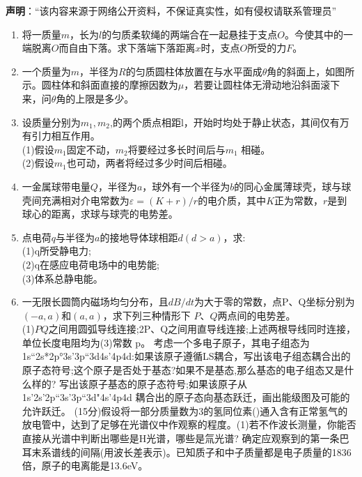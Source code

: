 

\textbf{声明}：“该内容来源于网络公开资料，不保证真实性，如有侵权请联系管理员”

\begin{enumerate}
\item 将一质量$m$，长为$l$的匀质柔软绳的两端合在一起悬挂于支点$O$。今使其中的一端脱离$O$而自由下落。求下落端下落距离$x$时，支点$O$所受的力$F$。
\item 一个质量为$m$，半径为$R$的匀质圆柱体放置在与水平面成$\theta$角的斜面上，如图所示。圆柱体和斜面直接的摩擦因数为$\mu$，若要让圆柱体无滑动地沿斜面滚下来，问$\theta$角的上限是多少。
\item 设质量分别为$m_1,m_2$,的两个质点相距l，开始时均处于静止状态，其间仅有万有引力相互作用。\\
(1)假设$m_1$固定不动，$m_2$将要经过多长时间后与$m_1$ 相碰。\\
(2)假设$m_1$也可动，两者将经过多少时间后相碰。
\item 一金属球带电量$Q$，半径为$a$，球外有一个半径为$b$的同心金属薄球壳，球与球壳间充满相对介电常数为$\varepsilon=(K+r)/r$的电介质，其中$K$正为常数，$r$是到球心的距离，求球与球壳的电势差。
\item 点电荷$q$与半径为$a$的接地导体球相距$d(d>a)$，求:\\
(1)q所受静电力;\\
(2)q在感应电荷电场中的电势能;\\
(3)体系总静电能。
\item 一无限长圆筒内磁场均匀分布，且$dB/dt$为大于零的常数，点P、Q坐标分别为$(-a,a)$和$(a,a)$，求下列三种情形下 $P$、$Q$两点间的电势差。\\
(1)$PQ$之间用圆弧导线连接;2P、Q之间用直导线连接;上述两根导线同时连接，单位长度电阻均为(3)常数 p。
考虑一个多电子原子，其电子组态为 1s“2s*2p°3s’3p“3d4s'4p4d:如果该原子遵循LS耦合，写出该电子组态耦合出的原子态符号;这个原子是否处于基态?如果不是基态,那么基态的电子组态又是什么样的?
写出该原子基态的原子态符号;如果该原子从 1s’2s’2p“3s’3p“3d"4s'4p4d 耦合出的原子态向基态跃迁，画出能级图及可能的允许跃迁。
(15分)假设将一部分质量数为3的氢同位素()通入含有正常氢气的放电管中，达到了足够在光谱仪中作观察的程度。(1)若不作波长测量，你能否直接从光谱中判断出哪些是H光谱，哪些是氚光谱?
确定应观察到的第一条巴耳末系谱线的间隔(用波长差表示)。已知质子和中子质量都是电子质量的1836倍，原子的电离能是13.6eV。
\end{enumerate}
